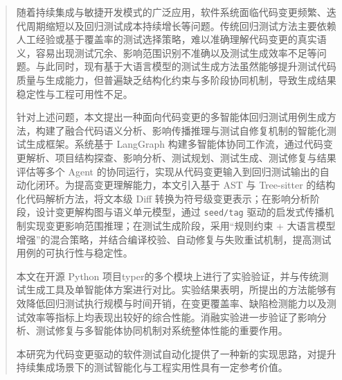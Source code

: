 
\begin{abstract}
随着持续集成与敏捷开发模式的广泛应用，软件系统面临代码变更频繁、迭代周期缩短以及回归测试成本持续增长等问题。传统回归测试方法主要依赖人工经验或基于覆盖率的测试选择策略，难以准确理解代码变更的真实语义，容易出现测试冗余、影响范围识别不准确以及测试生成效率不足等问题。与此同时，现有基于大语言模型的测试生成方法虽然能够提升测试代码质量与生成能力，但普遍缺乏结构化约束与多阶段协同机制，导致生成结果稳定性与工程可用性不足。

针对上述问题，本文提出一种面向代码变更的多智能体回归测试用例生成方法，构建了融合代码语义分析、影响传播推理与测试自修复机制的智能化测试生成框架。系统基于 LangGraph 构建多智能体协同工作流，通过代码变更解析、项目结构探查、影响分析、测试规划、测试生成、测试修复与结果评估等多个 Agent 的协同运行，实现从代码变更输入到回归测试输出的自动化闭环。为提高变更理解能力，本文引入基于 AST 与 Tree-sitter 的结构化代码解析方法，将文本级 Diff 转换为符号级变更表示；在影响分析阶段，设计变更解构图与语义单元模型，通过 \texttt{seed/tag} 驱动的启发式传播机制实现变更影响范围推理；在测试生成阶段，采用``规则约束 + 大语言模型增强''的混合策略，并结合编译校验、自动修复与失败重试机制，提高测试用例的可执行性与稳定性。

本文在开源 Python 项目typer的多个模块上进行了实验验证，并与传统测试生成工具及单智能体方案进行对比。实验结果表明，所提出的方法能够有效降低回归测试执行规模与时间开销，在变更覆盖率、缺陷检测能力以及测试效率等指标上均表现出较好的综合性能。消融实验进一步验证了影响分析、测试修复与多智能体协同机制对系统整体性能的重要作用。

本研究为代码变更驱动的软件测试自动化提供了一种新的实现思路，对提升持续集成场景下的测试智能化与工程实用性具有一定参考价值。

\end{abstract}


